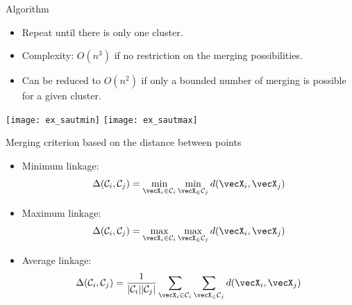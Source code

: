 \documentclass{beamer}\usepackage[]{graphicx}\usepackage[]{color}
\begin{document}
\begin{frame}[allowframebreaks]
\begin{block}{Algorithm}
\begin{itemize}
\begin{itemize}
into $\mathcal{C}_{i}^{(s+1)}$
\item Keep the $n-s-2$ other clusters
$\mathcal{C}_{i''}^{(s+1)} = \mathcal{C}_{i''}^{(s)}$
\end{itemize}
\item Repeat until there is only one cluster.
\end{itemize}
\end{block}
\vspace*{-.25cm}
\begin{itemize}
\item Complexity: $O(n^3)$ if no restriction on the merging
possibilities.
\item Can be reduced to $O(n^2)$ if only a bounded number of merging
is possible for a given cluster.
\end{itemize}
\framebreak
\begin{center}
\texttt{[image: ex\_sautmin]}
\hspace*{.1\textwidth}
\texttt{[image: ex\_sautmax]}
\end{center}
\begin{block}{Merging criterion based on the distance between points}
\begin{itemize}
\item Minimum linkage:
\begin{align*}
\Delta(\mathcal{C}_i, \mathcal{C}_j) = \min_{\vecX_i \in
\mathcal{C}_i} \min_{\vecX_ \in
\mathcal{C}_j} d(\vecX_i, \vecX_j)
\end{align*}
\item Maximum linkage:
\begin{align*}
\Delta(\mathcal{C}_i, \mathcal{C}_j) = \max_{\vecX_i \in
\mathcal{C}_i} \max_{\vecX_ \in
\mathcal{C}_j} d(\vecX_i, \vecX_j)
\end{align*}
\item Average linkage:
\begin{align*}
\Delta(\mathcal{C}_i, \mathcal{C}_j) = \frac{1}{|\mathcal{C}_i||\mathcal{C}_j|} \sum_{\vecX_i \in
\mathcal{C}_i}\sum_{\vecX_ \in
\mathcal{C}_j} d(\vecX_i, \vecX_j)
\end{align*}
\end{itemize}
\end{block}


\end{frame}
\end{document}
